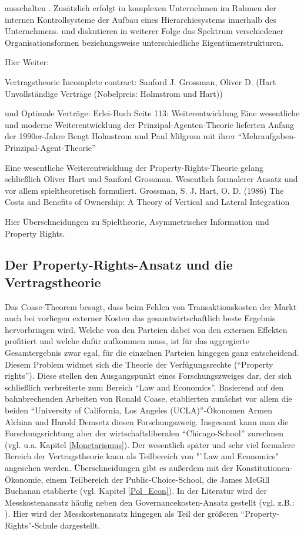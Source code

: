 ausschalten \parencite[S. 311]{Fama1983a}. Zusätzlich erfolgt in komplexen Unternehmen im Rahmen der internen Kontrollsysteme der Aufbau eines Hierarchiesystems innerhalb des Unternehmens. \textcite[S. 313ff]{Fama1983a} und \textcite{Fama1983b} diskutieren in weiterer Folge das Spektrum verschiedener Organisationsformen beziehungsweise unterschiedliche Eigentümerstrukturen.


Hier Weiter:




\parencite{Nobelpreis-Komitee2016}
Vertragstheorie Incomplete contract: Sanford J. Grossman, Oliver D. (Hart Unvollständige Verträge (Nobelpreis: Holmstrom und Hart))

und
Optimale Verträge: 
Erlei-Buch Seite 113: Weiterentwicklung
Eine wesentliche und moderne Weiterentwicklung der Prinzipal-Agenten-Theorie lieferten Anfang der 1990er-Jahre Bengt Holmstrom und Paul Milgrom mit ihrer "`Mehraufgaben-Prinzipal-Agent-Theorie"' 


Eine wesentliche Weiterentwicklung der Property-Rights-Theorie gelang schließlich Oliver Hart und Sanford Grossman. Wesentlich formalerer Ansatz und vor allem spieltheoretisch formuliert. Grossman, S. J. Hart, O. D. (1986) The Costs and Benefits of Ownership: A Theory of Vertical and Lateral Integration

Hier Überschneidungen zu Spieltheorie, Asymmetrischer Information und Property Rights.

\subsection{Der Property-Rights-Ansatz und die Vertragstheorie}
\label{sec: Property Rights}

Das Coase-Theorem besagt, dass beim Fehlen von Transaktionskosten der Markt auch bei vorliegen externer Kosten das gesamtwirtschaftlich beste Ergebnis hervorbringen wird. Welche von den Parteien dabei von den externen Effekten profitiert und welche dafür aufkommen muss, ist für das aggregierte Gesamtergebnis zwar egal, für die einzelnen Parteien hingegen ganz entscheidend. Diesem Problem widmet sich die Theorie der Verfügungsrechte ("`Property rights"'). Diese stellen den Ausgangspunkt eines Forschungszweiges dar, der sich schließlich verbreiterte zum Bereich "`Law and Economics"'. Basierend auf den bahnbrechenden Arbeiten von Ronald Coase, etablierten zunächst vor allem die beiden "`University of California, Los Angeles (UCLA)"'-Ökonomen Armen Alchian und Harold Demsetz diesen Forschungszweig. Insgesamt kann man die Forschungsrichtung aber der wirtschaftsliberalen "`Chicago-School"' zurechnen (vgl. u.a. Kapitel \ref{Monetarismus}). Der wesentlich später und sehr viel formalere Bereich der Vertragstheorie kann als Teilbereich von "`Law and Economics" angesehen werden. Überschneidungen gibt es außerdem mit der Konstitutionen-Ökonomie, einem Teilbereich der Public-Choice-School, die James McGill Buchanan etablierte (vgl. Kapitel \ref{Pol_Econ}). In der Literatur wird der Messkostenansatz häufig neben den Governancekosten-Ansatz gestellt (vgl. z.B.: \parencite[S. 40]{Erlei2016}). Hier wird der Messkostenansatz hingegen als Teil der größeren "`Property-Rights"'-Schule dargestellt.


